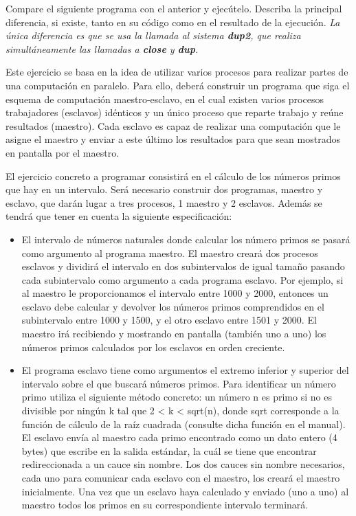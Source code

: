 \begin{exercise}
Compare el siguiente programa con el anterior y ejecútelo. Describa la
principal diferencia, si existe, tanto en su código como en el resultado de la ejecución.
\emph{La única diferencia es que se usa la llamada al sistema \textbf{dup2}, que realiza simultáneamente las llamadas a \textbf{close} y \textbf{dup}.}
\end{exercise}

\begin{exercise}
Este ejercicio se basa en la idea de utilizar varios procesos para realizar partes de una
computación en paralelo. Para ello, deberá construir un programa que siga el esquema de
computación maestro-esclavo, en el cual existen varios procesos trabajadores (esclavos)
idénticos y un único proceso que reparte trabajo y reúne resultados (maestro). Cada esclavo
es capaz de realizar una computación que le asigne el maestro y enviar a este último los
resultados para que sean mostrados en pantalla por el maestro.

El ejercicio concreto a programar consistirá en el cálculo de los números primos que hay en
un intervalo. Será necesario construir dos programas, maestro y esclavo, que darán lugar a
tres procesos, 1 maestro y 2 esclavos. Además se tendrá que tener en cuenta la siguiente
especificación:

\begin{itemize}
    \item El intervalo de números naturales donde calcular los número primos se pasará como
argumento al programa maestro. El maestro creará dos procesos esclavos y dividirá
el intervalo en dos subintervalos de igual tamaño pasando cada subintervalo como
argumento a cada programa esclavo. Por ejemplo, si al maestro le proporcionamos el
intervalo entre 1000 y 2000, entonces un esclavo debe calcular y devolver los
números primos comprendidos en el subintervalo entre 1000 y 1500, y el otro esclavo
entre 1501 y 2000. El maestro irá recibiendo y mostrando en pantalla (también uno a
uno) los números primos calculados por los esclavos en orden creciente.
    \item El programa esclavo tiene como argumentos el extremo inferior y superior del
intervalo sobre el que buscará números primos. Para identificar un número primo
utiliza el siguiente método concreto: un número n es primo si no es divisible por
ningún k tal que 2 < k < sqrt(n), donde sqrt corresponde a la función de cálculo de la
raíz cuadrada (consulte dicha función en el manual). El esclavo envía al maestro cada
primo encontrado como un dato entero (4 bytes) que escribe en la salida estándar, la
cuál se tiene que encontrar redireccionada a un cauce sin nombre. Los dos cauces sin
nombre necesarios, cada uno para comunicar cada esclavo con el maestro, los creará
el maestro inicialmente. Una vez que un esclavo haya calculado y enviado (uno a uno)
al maestro todos los primos en su correspondiente intervalo terminará.
\end{itemize}
\end{exercise}
